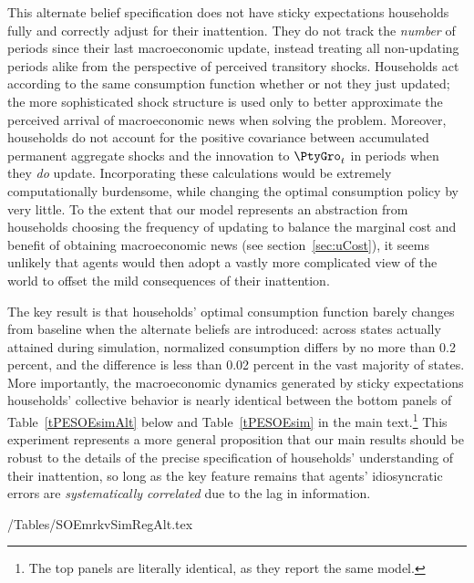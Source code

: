 This alternate belief specification does not have sticky expectations households fully and correctly adjust for their inattention.  They do not track the \textit{number} of periods since their last macroeconomic update, instead treating all non-updating periods alike from the perspective of perceived transitory shocks. Households act according to the same consumption function whether or not they just updated; the more sophisticated shock structure is used only to better approximate the perceived arrival of macroeconomic news when solving the problem.  Moreover, households do not account for the positive covariance between accumulated permanent aggregate shocks and the innovation to $\PtyGro_t$ in periods when they \textit{do} update.  Incorporating these calculations would be extremely computationally burdensome, while changing the optimal consumption policy by very little.  To the extent that our model represents an abstraction from households choosing the frequency of updating to balance the marginal cost and benefit of obtaining macroeconomic news (see section~\ref{sec:uCost}), it seems unlikely that agents would then adopt a vastly more complicated view of the world to offset the mild consequences of their inattention.

The key result is that households' optimal consumption function barely changes from baseline when the alternate beliefs are introduced: across states actually attained during simulation, normalized consumption differs by no more than 0.2 percent, and the difference is less than 0.02 percent in the vast majority of states.  More importantly, the macroeconomic dynamics generated by sticky expectations households' collective behavior is nearly identical between the bottom panels of Table~\ref{tPESOEsimAlt} below and Table~\ref{tPESOEsim} in the main text.\footnote{The top panels are literally identical, as they report the same model.}  This experiment represents a more general proposition that our main results should be robust to the details of the precise specification of households' understanding of their inattention, so long as the key feature remains that agents' idiosyncratic errors are \textit{systematically correlated} due to the lag in information.


\econtexRoot/Tables/SOEmrkvSimRegAlt.tex